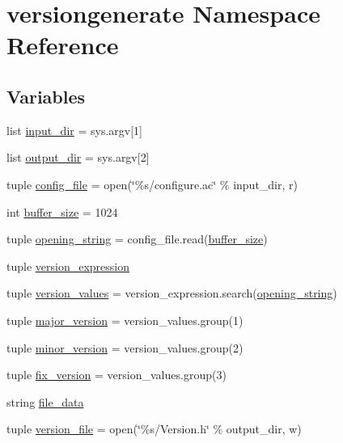 \hypertarget{namespaceversiongenerate}{}\section{versiongenerate Namespace Reference}
\label{namespaceversiongenerate}
\subsection*{Variables}
\begin{DoxyCompactItemize}
\item 
list \hyperlink{namespaceversiongenerate_a035dbc8bc18034df9f39d74ef7b63f04}{input\+\_\+dir} = sys.\+argv\mbox{[}1\mbox{]}
\item 
list \hyperlink{namespaceversiongenerate_a66aeb3b9df50fe61aa16e436b75f5a9a}{output\+\_\+dir} = sys.\+argv\mbox{[}2\mbox{]}
\item 
tuple \hyperlink{namespaceversiongenerate_a83593153f3d0b56342efa807726b5d39}{config\+\_\+file} = open(\char`\"{}\%s/configure.\+ac\char`\"{} \% input\+\_\+dir, \textquotesingle{}r\textquotesingle{})
\item 
int \hyperlink{namespaceversiongenerate_a5656c48d43f7e869041b6a30c124702e}{buffer\+\_\+size} = 1024
\item 
tuple \hyperlink{namespaceversiongenerate_a6adb70bc03a954c71bcf964a1cb51523}{opening\+\_\+string} = config\+\_\+file.\+read(\hyperlink{namespaceversiongenerate_a5656c48d43f7e869041b6a30c124702e}{buffer\+\_\+size})
\item 
tuple \hyperlink{namespaceversiongenerate_a7f509e15e9ef2fe82d5fad077a0f901c}{version\+\_\+expression}
\item 
tuple \hyperlink{namespaceversiongenerate_aec88e2b4a2964885f9e88c055cc0cf69}{version\+\_\+values} = version\+\_\+expression.\+search(\hyperlink{namespaceversiongenerate_a6adb70bc03a954c71bcf964a1cb51523}{opening\+\_\+string})
\item 
tuple \hyperlink{namespaceversiongenerate_a792a7f9df0084617e1ddaf10548bbaf8}{major\+\_\+version} = version\+\_\+values.\+group(1)
\item 
tuple \hyperlink{namespaceversiongenerate_a09b0aa308f4f63c03e547bac116061f1}{minor\+\_\+version} = version\+\_\+values.\+group(2)
\item 
tuple \hyperlink{namespaceversiongenerate_a409471f03e765e6658400941518fde18}{fix\+\_\+version} = version\+\_\+values.\+group(3)
\item 
string \hyperlink{namespaceversiongenerate_aa7a8a587902d8dc493945992ec3fcf60}{file\+\_\+data}
\item 
tuple \hyperlink{namespaceversiongenerate_af3ac1aa2af0e761691fdda9a58f461a4}{version\+\_\+file} = open(\char`\"{}\%s/Version.\+h\char`\"{} \% output\+\_\+dir, \textquotesingle{}w\textquotesingle{})
\end{DoxyCompactItemize}



